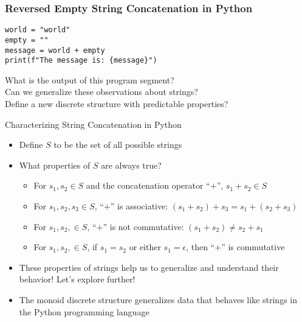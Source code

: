 \documentclass[14pt,aspectratio=169]{beamer}
\begin{document}
%
\begin{frame}[fragile]
  \frametitle{Reversed Empty String Concatenation in Python}
  \begin{minipage}{6in}
    \vspace*{.25in}
    \begin{verbatim}
world = "world"
empty = ""
message = world + empty
print(f"The message is: {message}")
    \end{verbatim}
  \end{minipage}
  \vspace*{.05in}
  \begin{center}
    \normalsize \noindent What is the output of this program segment? \\
    \normalsize \noindent Can we generalize these observations about strings? \\
    \normalsize \noindent Define a new discrete structure with predictable properties? \\
  \end{center}
\end{frame}

%
\begin{frame}{Characterizing String Concatenation in Python}
  \begin{itemize}
    \item Define $S$ to be the set of all possible strings
      \vspace*{-.15in}
    \item What properties of $S$ are always true?
      \begin{itemize}
        \item For $s_1, s_2 \in S$ and the concatenation operator ``$+$'', $s_1
          + s_2 \in S$
        \item For $s_1, s_2, s_3 \in S$, ``$+$'' is associative: $(s_1 + s_2) +
          s_3 = s_1 + (s_2 + s_3)$
        \item For $s_1, s_2, \in S$, ``$+$'' is not commutative: $(s_1 + s_2)
          \neq s_2 + s_1$
        \item For $s_1, s_2, \in S$, if $s_1 = s_2$ or either $s_1 = \epsilon$,
          then ``$+$'' is commutative
      \end{itemize}
      \vspace*{-.2in}
    \item These properties of strings help us to generalize and understand their
      behavior! Let's explore further!
      \vspace*{-.2in}
    \item The monoid discrete structure generalizes data that behaves like
      strings in the Python programming language
  \end{itemize}
\end{frame}
\end{document}
